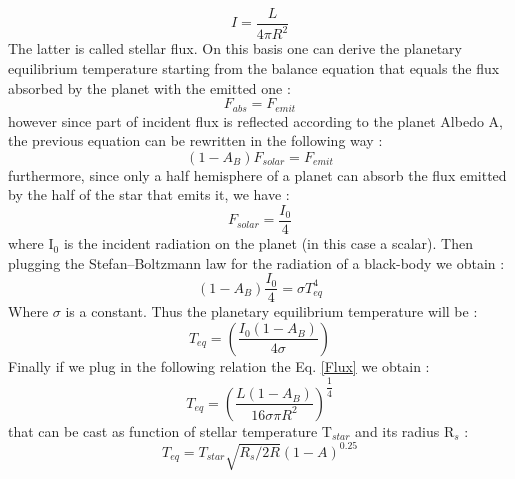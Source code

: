 \documentclass[
12pt, %
a4paper, %
oneside, %
headinclude,footinclude, %
BCOR5mm, %
]{scrartcl}
\begin{document}
\begin{equation}
 I =\dfrac{L}{4\pi R^{2}}
\label{Flux}
\end{equation}
The latter is called stellar flux. On this basis one can derive the planetary equilibrium temperature starting from the balance equation that equals the flux absorbed by the planet with the emitted one \cite{catling2017atmospheric}: 
\begin{equation}
F_{abs}=F_{emit}
\end{equation}
however since part of incident flux is reflected according to the planet Albedo A, the previous equation can be rewritten in the following way \cite{catling2017atmospheric}:
\begin{equation}
(1-A_{B})F_{solar}=F_{emit}
\end{equation}
furthermore, since only a half hemisphere of a planet can absorb the flux emitted by the half of the star that emits it, we have \cite{catling2017atmospheric}:
\begin{equation}
F_{solar}=\dfrac{I_{0}}{4}
\end{equation}
where I$_{0}$ is the incident radiation on the planet (in this case a scalar). Then plugging the Stefan–Boltzmann law for the radiation of a black-body we obtain \cite{catling2017atmospheric}: 
\begin{equation}
\left(1-A_{B}\right)\dfrac{I_{0}}{4}=\sigma T^{4}_{eq}
\end{equation}
Where $\sigma$ is a constant. Thus the planetary equilibrium temperature will be \cite{catling2017atmospheric}:
\begin{equation}
T_{eq}=\left(\dfrac{I_{0}\left(1-A_{B}\right)}{4\sigma}\right)
\end{equation}
Finally if we plug in the following relation the Eq. \ref{Flux} we obtain \cite{catling2017atmospheric}:
\begin{equation}
T_{eq}=\left(\dfrac{L\left(1-A_{B}\right)}{16\sigma\pi R^{2}}\right)^{\dfrac{1}{4}}
\end{equation}
that can be cast as function of stellar temperature  T$_{star}$ and its radius R$_{s}$ \cite{catling2017atmospheric}:
\begin{equation}
T_{eq}=T_{star}\sqrt{R_{s}/2R}\left(1-A\right)^{0.25}
\end{equation}
\end{document}
